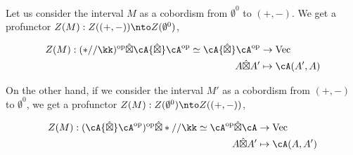\documentclass[12pt]{article}
\newcommand{\empt}[1]{{\emptyset^{#1}}}
\newcommand{\op}{{\text{op}}}
\newcommand{\hatbox}{{\hat{\boxtimes}}}
\DeclareMathOperator{\Vect}{Vec}
\begin{document}
\begin{example}
\label{x:cup-cap}
Let us consider the interval $M$
as a cobordism from $\empt{0}$ to $(+,-)$.
We get a profunctor
$Z(M) : Z((+,-)) \nto Z(\empt{0})$,

\begin{align*}
Z(M) : (*//\kk)^\op \hatbox \cA \hatbox \cA^\op
\simeq \cA \hatbox \cA^\op
&\to \Vect
\\
A \hatbox A' &\mapsto \cA(A',A)
\end{align*}

On the other hand, if we consider the interval $M'$
as a cobordism from $(+,-)$ to $\empt{0}$,
we get a profunctor
$Z(M) : Z(\empt{0}) \nto Z((+,-))$,

\begin{align*}
Z(M) : (\cA \hatbox \cA^\op)^\op \hatbox *//\kk
\simeq \cA^\op \hatbox \cA
&\to \Vect
\\
A \hatbox A' &\mapsto \cA(A,A')
\end{align*}
\end{example}
\end{document}
